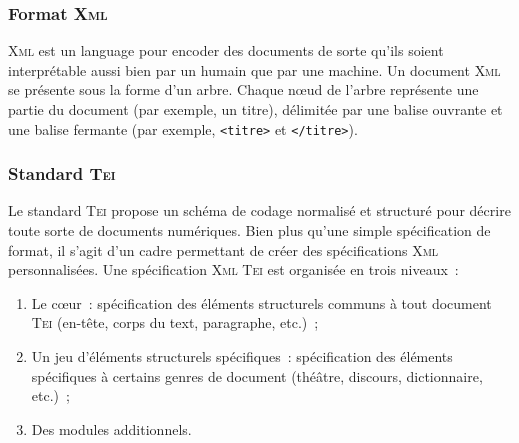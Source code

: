       \subsubsection{Format \textsc{Xml}}
      \label{subsubsec:main-automatic_evaluation_of_keyphrase_annotation-methodology-data_format-xml}
        \textsc{Xml} est un language pour encoder des documents de sorte qu'ils
        soient interprétable aussi bien par un humain que par une machine. Un
        document \textsc{Xml} se présente sous la forme d'un arbre. Chaque
        n\oe{}ud de l'arbre représente une partie du document (par exemple, un
        titre), délimitée par une balise ouvrante et une balise fermante (par
        exemple, \texttt{<titre>} et \texttt{</titre>}).


      \subsubsection{Standard \textsc{Tei}}
      \label{subsubsec:main-automatic_evaluation_of_keyphrase_annotation-methodology-data_format-tei}
        Le standard \textsc{Tei} propose un schéma de codage normalisé et
        structuré pour décrire toute sorte de documents numériques. Bien plus
        qu'une simple spécification de format, il s'agit d'un cadre permettant
        de créer des spécifications \textsc{Xml} personnalisées. Une
        spécification \textsc{Xml} \textsc{Tei} est organisée en trois niveaux~:
        \begin{enumerate}
          \item{Le c\oe{}ur~: spécification des éléments structurels communs à
                tout document \textsc{Tei} (en-tête, corps du text, paragraphe,
                etc.)~;}
          \item{Un jeu d'éléments structurels spécifiques~: spécification des
                éléments spécifiques à certains genres de document (théâtre,
                discours, dictionnaire, etc.)~;}
          \item{Des modules additionnels.}
        \end{enumerate}


